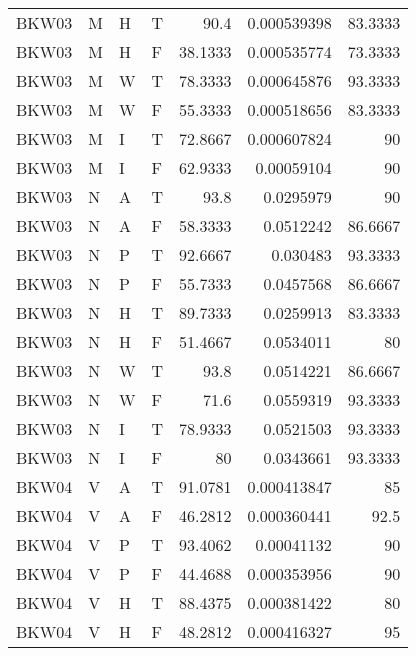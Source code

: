 \begin{longtable}{llllrrr}
    BKW03    & M     & H     & T          & 90.4       & 0.000539398 & 83.3333  \\
    BKW03    & M     & H     & F          & 38.1333    & 0.000535774 & 73.3333  \\
    BKW03    & M     & W     & T          & 78.3333    & 0.000645876 & 93.3333  \\
    BKW03    & M     & W     & F          & 55.3333    & 0.000518656 & 83.3333  \\
    BKW03    & M     & I     & T          & 72.8667    & 0.000607824 & 90       \\
    BKW03    & M     & I     & F          & 62.9333    & 0.00059104  & 90       \\
    BKW03    & N     & A     & T          & 93.8       & 0.0295979   & 90       \\
    BKW03    & N     & A     & F          & 58.3333    & 0.0512242   & 86.6667  \\
    BKW03    & N     & P     & T          & 92.6667    & 0.030483    & 93.3333  \\
    BKW03    & N     & P     & F          & 55.7333    & 0.0457568   & 86.6667  \\
    BKW03    & N     & H     & T          & 89.7333    & 0.0259913   & 83.3333  \\
    BKW03    & N     & H     & F          & 51.4667    & 0.0534011   & 80       \\
    BKW03    & N     & W     & T          & 93.8       & 0.0514221   & 86.6667  \\
    BKW03    & N     & W     & F          & 71.6       & 0.0559319   & 93.3333  \\
    BKW03    & N     & I     & T          & 78.9333    & 0.0521503   & 93.3333  \\
    BKW03    & N     & I     & F          & 80         & 0.0343661   & 93.3333  \\
    BKW04    & V     & A     & T          & 91.0781    & 0.000413847 & 85       \\
    BKW04    & V     & A     & F          & 46.2812    & 0.000360441 & 92.5     \\
    BKW04    & V     & P     & T          & 93.4062    & 0.00041132  & 90       \\
    BKW04    & V     & P     & F          & 44.4688    & 0.000353956 & 90       \\
    BKW04    & V     & H     & T          & 88.4375    & 0.000381422 & 80       \\
    BKW04    & V     & H     & F          & 48.2812    & 0.000416327 & 95       \\

\end{longtable}
